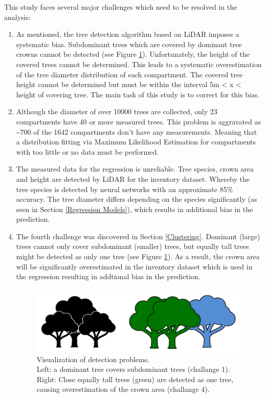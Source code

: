 
This study faces several major challenges which need to be resolved in the analysis:

\renewcommand{\labelenumi}{\arabic{enumi}.}
\begin{enumerate}

\item As mentioned, the tree detection algorithm based on LiDAR imposes a systematic bias.
Subdominant trees which are covered by dominant tree crowns cannot be detected (see Figure \ref{fig:dominant_trees}).
Unfortunately, the height of the covered trees cannot be determined. This leads to a systematic overestimation of the tree diameter distribution of each compartment. The covered tree height cannot be determined but must be within the interval 5m < x < height of covering tree. The main task of this study is to correct for this bias.

\item Although the diameter of over 10000 trees are collected, only 23 compartments have 40 or more
measured trees. This problem is aggravated as \textasciitilde 700 of the 1642 compartments don’t have any measurements.
Meaning that a distribution fitting via Maximum Likelihood Estimation for compartments with too little or no data must be performed.

\item The measured data for the regression is unreliable. Tree species, crown area and height are
detected by LiDAR for the inventory dataset. Whereby the tree species is detected by neural networks with an approximate 85\% accuracy. The tree diameter differs depending on the species significantly (as seen in Section \ref{Regression Models}), which results in additional bias in the prediction.

\item The fourth challenge was discovered in Section \ref{Clustering}. Dominant (large) trees cannot only
cover subdominant (smaller) trees, but equally tall trees might be detected as only one tree (see Figure \ref{fig:dominant_trees}). As a result, the crown area will be significantly overestimated in the inventory dataset which is used in the regression resulting in addtional bias in the prediction.

\begin{figure}[H]
  \includegraphics[width=\textwidth]{dominant_trees.png}
  \caption{Visualization of detection problems.\\ Left: a dominant tree covers subdominant
trees (challange 1).\\ Right: Close equally tall trees (green) are detected as one tree, causing
overestimation of the crown area (challange 4).}
  \label{fig:dominant_trees}
\end{figure}

\end{enumerate}
